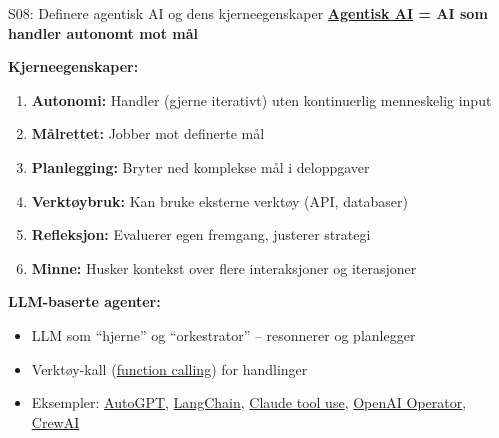 \documentclass[aspectratio=169, 10pt]{beamer}
\begin{document}
\begin{frame}{S08: Definere agentisk AI og dens kjerneegenskaper}
    \textbf{\href{https://en.wikipedia.org/wiki/Agentic_AI}{Agentisk AI} = AI som handler autonomt mot mål}
    
    \vspace{0.2cm}
    \textbf{Kjerneegenskaper:}
    \begin{enumerate}
        \item \textbf{Autonomi:} Handler (gjerne iterativt) uten kontinuerlig menneskelig input
        \item \textbf{Målrettet:} Jobber mot definerte mål
        \item \textbf{Planlegging:} Bryter ned komplekse mål i deloppgaver
        \item \textbf{Verktøybruk:} Kan bruke eksterne verktøy (API, databaser)
        \item \textbf{Refleksjon:} Evaluerer egen fremgang, justerer strategi
        \item \textbf{Minne:} Husker kontekst over flere interaksjoner og iterasjoner
    \end{enumerate}
    
    \vspace{0.2cm}
    \textbf{LLM-baserte agenter:}
    \begin{itemize}
        \item LLM som ``hjerne'' og ``orkestrator'' -- resonnerer og planlegger
        \item Verktøy-kall (\href{https://platform.openai.com/docs/guides/function-calling}{function calling}) for handlinger
        \item Eksempler: \href{https://github.com/Significant-Gravitas/AutoGPT}{AutoGPT}, \href{https://www.langchain.com/}{LangChain}, \href{https://docs.anthropic.com/claude/docs/tool-use}{Claude tool use}, \href{https://openai.com/index/introducing-gpt-4o-with-computer-use/}{OpenAI Operator}, \href{https://www.crewai.com/}{CrewAI}
    \end{itemize}
\end{frame}
\end{document}
